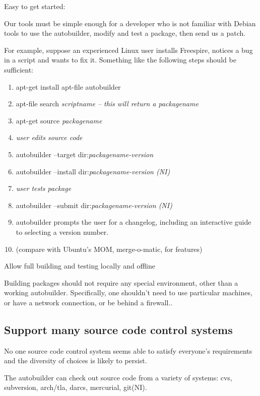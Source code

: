 \documentclass[12pt]{article}
\newcommand{\notimplemented}{(NI)}
\begin{document}
\begin{description}
\item{Easy to get started:}

Our tools must be simple enough for a developer who is not familiar
with Debian tools to use the autobuilder, modify and test a package,
then send us a patch.

For example, suppose an experienced Linux user installs Freespire,
notices a bug in a script and wants to fix it.  Something like the
following steps should be sufficient:

\begin{enumerate}
\item apt-get install apt-file autobuilder
\item apt-file search \em{scriptname} -- this will return a \em{packagename}
\item apt-get source \em{packagename}
\item \em{user edits source code}
\item autobuilder --target dir:\em{packagename-version}
\item autobuilder --install dir:\em{packagename-version} \notimplemented
\item \em{user tests package}
\item autobuilder --submit dir:\em{packagename-version}
  \notimplemented
\item autobuilder prompts the user for a changelog, including an
  interactive guide to selecting a version number.
\item (compare with Ubuntu's MOM, merge-o-matic, for features)
\end{enumerate}


\item{Allow full building and testing locally and offline}

Building packages should not require any special environment, other
than a working autobuilder.  Specifically, one shouldn't need to use
particular machines, or have a network connection, or be behind a firewall..

\subsection{Support many source code control systems}

No one source code control system seems able to satisfy everyone's
requirements and the diversity of choices is likely to persist.

The autobuilder can check out source code from a variety of systems:
cvs, subversion, arch/tla, darcs, mercurial, git\notimplemented.


\end{description}
\end{document}
